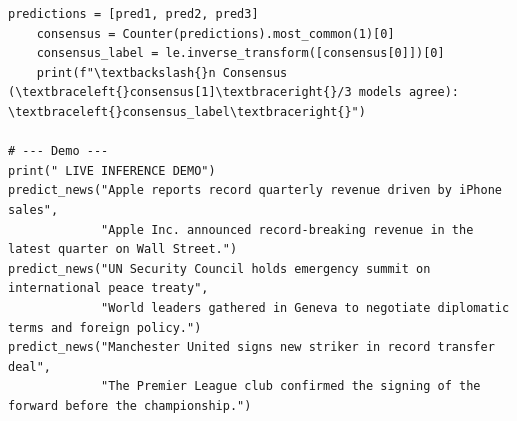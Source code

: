 \documentclass[12pt,a4paper,oneside]{report}
\begin{document}
\begin{Verbatim}[commandchars=\\\{\},breaklines=true,breakanywhere=true,fontsize=\scriptsize,frame=leftline,framesep=2mm,rulecolor=\color{gray}]
    predictions = [pred1, pred2, pred3]
    consensus = Counter(predictions).most_common(1)[0]
    consensus_label = le.inverse_transform([consensus[0]])[0]
    print(f"\textbackslash{}n Consensus (\textbraceleft{}consensus[1]\textbraceright{}/3 models agree): \textbraceleft{}consensus_label\textbraceright{}")

# --- Demo ---
print(" LIVE INFERENCE DEMO")
predict_news("Apple reports record quarterly revenue driven by iPhone sales",
             "Apple Inc. announced record-breaking revenue in the latest quarter on Wall Street.")
predict_news("UN Security Council holds emergency summit on international peace treaty",
             "World leaders gathered in Geneva to negotiate diplomatic terms and foreign policy.")
predict_news("Manchester United signs new striker in record transfer deal",
             "The Premier League club confirmed the signing of the forward before the championship.")
\end{Verbatim}
\end{document}
